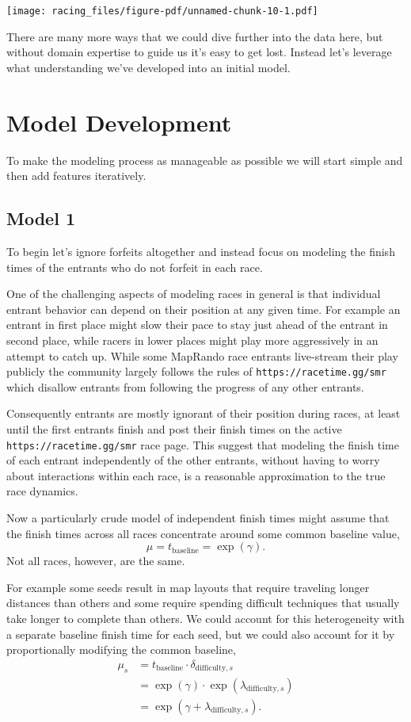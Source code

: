 \documentclass[
  letterpaper,
  DIV=11,
  numbers=noendperiod]{scrartcl}
\begin{document}
\texttt{[image: racing\_files/figure-pdf/unnamed-chunk-10-1.pdf]}

There are many more ways that we could dive further into the data here,
but without domain expertise to guide us it's easy to get lost. Instead
let's leverage what understanding we've developed into an initial model.

\section{Model Development}\label{model-development}

To make the modeling process as manageable as possible we will start
simple and then add features iteratively.

\subsection{Model 1}\label{model-1}

To begin let's ignore forfeits altogether and instead focus on modeling
the finish times of the entrants who do not forfeit in each race.

One of the challenging aspects of modeling races in general is that
individual entrant behavior can depend on their position at any given
time. For example an entrant in first place might slow their pace to
stay just ahead of the entrant in second place, while racers in lower
places might play more aggressively in an attempt to catch up. While
some MapRando race entrants live-stream their play publicly the
community largely follows the rules of \texttt{https://racetime.gg/smr}
which disallow entrants from following the progress of any other
entrants.

Consequently entrants are mostly ignorant of their position during
races, at least until the first entrants finish and post their finish
times on the active \texttt{https://racetime.gg/smr} race page. This
suggest that modeling the finish time of each entrant independently of
the other entrants, without having to worry about interactions within
each race, is a reasonable approximation to the true race dynamics.

Now a particularly crude model of independent finish times might assume
that the finish times across all races concentrate around some common
baseline value, \[
\mu = t_{\mathrm{baseline}} = \exp(\gamma).
\] Not all races, however, are the same.

For example some seeds result in map layouts that require traveling
longer distances than others and some require spending difficult
techniques that usually take longer to complete than others. We could
account for this heterogeneity with a separate baseline finish time for
each seed, but we could also account for it by proportionally modifying
the common baseline, \begin{align*}
\mu_{s}
&=
t_{\mathrm{baseline}} \cdot \delta_{\mathrm{difficulty}, s}
\\
&=
\exp(\gamma) \cdot \exp( \lambda_{\mathrm{difficulty}, s} )
\\
&=
\exp(\gamma + \lambda_{\mathrm{difficulty}, s}).
\end{align*}
\end{document}
